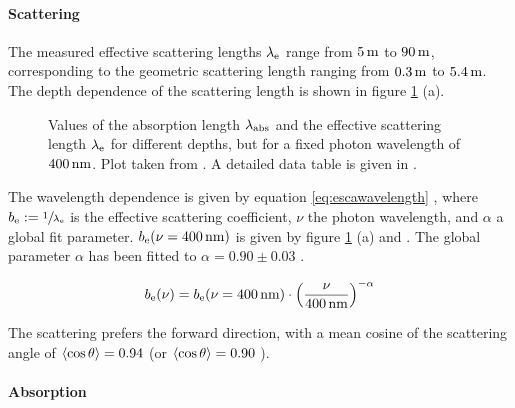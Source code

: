 \paragraph{Scattering}

The measured effective scattering lengths \(\lambda_\text{e}\) range from
\(5\text{\,m}\) to \(90\text{\,m}\), corresponding to the geometric scattering length
ranging from \(0.3\text{\,m}\) to \(5.4\text{\,m}\). The depth dependence of the
scattering length is shown in figure \ref{fig:Ahxobai3} (a).
\cite{icepaper}

\begin{figure}[htbp]
  \hfill
  \caption{Values of the absorption length $\lambda_\text{abs}$ and the effective scattering length $\lambda_\text{e}$ for different depths, but for a fixed photon wavelength of $400\text{\,nm}$. Plot taken from \cite[figure 16]{icepaper}. A detailed data table is given in \cite[table C1]{icepaper}.}
  \label{fig:Ahxobai3}
\end{figure}

The wavelength dependence is given by equation \ref{eq:escawavelength}
\cite[section 4]{icepaper}, where
\(b_\text{e} := \sfrac{1}{\lambda_\text{e}}\) is the effective scattering
coefficient, \(\nu\) the photon wavelength, and \(\alpha\) a global fit
parameter. \(b_\text{e}(\nu = 400\text{\,nm})\) is given by figure
\ref{fig:Ahxobai3} (a) and \cite[table C4]{icepaper}. The global
parameter \(\alpha\) has been fitted to \(\alpha = 0.90 \pm 0.03\)
\cite[section 5.1]{ackermann}.

\begin{equation}
  b_\text{e}(\nu) = b_\text{e}(\nu = 400\text{\,nm}) \cdot \left(\frac{\nu}{400\text{\,nm}}\right)^{-\alpha}
  \label{eq:escawavelength}
\end{equation}

The scattering prefers the forward direction, with a mean cosine of the
scattering angle of \(\langle \cos \theta \rangle = 0.94\)
\cite[paragraph 9]{ackermann} (or \(\langle \cos \theta \rangle = 0.90\)
\cite{icepaper}).

\paragraph{Absorption}

